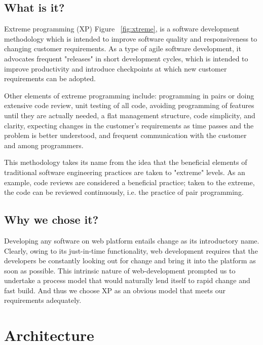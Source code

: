 \subsection{What is it?}

Extreme programming (XP) Figure ~\ref{fig:xtreme}, is a software development methodology which is intended to improve software quality and responsiveness to changing customer requirements. As a type of agile software development, it advocates frequent "releases" in short development cycles, which is intended to improve productivity and introduce checkpoints at which new customer requirements can be adopted.

Other elements of extreme programming include: programming in pairs or doing extensive code review, unit testing of all code, avoiding programming of features until they are actually needed, a flat management structure, code simplicity, and clarity, expecting changes in the customer's requirements as time passes and the problem is better understood, and frequent communication with the customer and among programmers.

This methodology takes its name from the idea that the beneficial elements of traditional software engineering practices are taken to "extreme" levels. As an example, code reviews are considered a beneficial practice; taken to the extreme, the code can be reviewed continuously, i.e. the practice of pair programming.

\subsection{Why we chose it?}

Developing any software on web platform entails change as its introductory name. Clearly, owing to its just-in-time functionality, web development requires that the developers be constantly looking out for change and bring it into the platform as soon as possible. This intrinsic nature of web-development prompted us to undertake a process model that would naturally lend itself to rapid change and fast build. And thus we choose XP as an obvious model that meets our requirements adequately.

\section{Architecture}

